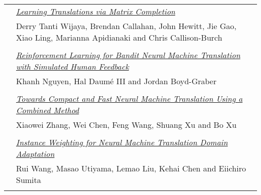 \begin{tabular}{p{20mm}p{128mm}}
 & \hyperlink{page.1451}{\em Learning Translations via Matrix Completion}\\
         & Derry Tanti Wijaya, Brendan Callahan, John Hewitt, Jie Gao, Xiao Ling, Marianna Apidianaki and Chris Callison-Burch \\
\\

 & \hyperlink{page.1463}{\em Reinforcement Learning for Bandit Neural Machine Translation with Simulated Human Feedback}\\
         & Khanh Nguyen, Hal Daum\'{e} III and Jordan Boyd-Graber \\
\\

 & \hyperlink{page.1474}{\em Towards Compact and Fast Neural Machine Translation Using a Combined Method}\\
         & Xiaowei Zhang, Wei Chen, Feng Wang, Shuang Xu and Bo Xu \\
\\

 & \hyperlink{page.1481}{\em Instance Weighting for Neural Machine Translation Domain Adaptation}\\
         & Rui Wang, Masao Utiyama, Lemao Liu, Kehai Chen and Eiichiro Sumita \\
\\

\end{tabular}
\newpage
